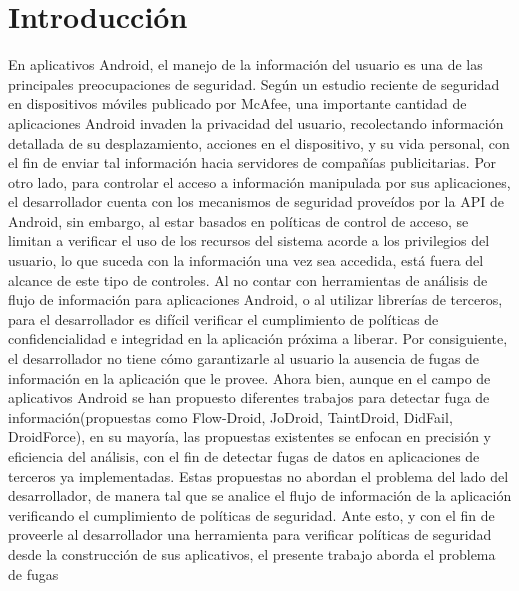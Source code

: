 \label{ch:introduccion}
\chapter{Introducción}
En aplicativos Android, el manejo de la información del usuario es una de las
principales preocupaciones de seguridad. Según un estudio reciente de seguridad
en dispositivos móviles publicado por McAfee\cite{McAfeeReport}, una importante
cantidad de aplicaciones Android invaden la privacidad del usuario, recolectando
información detallada de su desplazamiento, acciones en el dispositivo, y su
vida personal, con el fin de enviar tal información hacia servidores de
compañías publicitarias.\newline 
Por otro lado, para controlar el acceso a información manipulada por sus
aplicaciones, el desarrollador cuenta con los mecanismos de seguridad proveídos
por la API de Android, sin embargo, al estar basados en políticas de control de
acceso, se limitan a verificar el uso de los recursos del sistema acorde a los
privilegios del usuario, lo que suceda con la información una vez sea accedida,
está fuera del alcance de este tipo de controles.\newline 
Al no contar con herramientas de análisis de flujo de información para
aplicaciones Android, o al utilizar librerías de terceros, para el desarrollador
es difícil verificar el cumplimiento de políticas de confidencialidad e
integridad en la aplicación próxima a liberar. Por consiguiente, el
desarrollador no tiene cómo garantizarle al usuario la ausencia de fugas de
información en la aplicación que le provee.\newline 
Ahora bien, aunque en el campo de aplicativos Android se han propuesto
diferentes trabajos para detectar fuga de información(propuestas como
Flow-Droid\cite{FlowDroid-Thesis}, JoDroid\cite{JoDroid-Paper},
TaintDroid\cite{TaintDroid}, DidFail\cite{DidFail},
DroidForce\cite{DroidForce}), en su mayoría, las propuestas existentes se
enfocan en precisión y eficiencia del análisis, con el fin de detectar
fugas de datos en aplicaciones de terceros ya implementadas.
Estas propuestas no abordan el problema del lado del desarrollador, de
manera tal que se analice el flujo de información de la aplicación verificando
el cumplimiento de políticas de seguridad.\newline 
Ante esto, y con el fin de proveerle al desarrollador una
herramienta para verificar políticas de seguridad desde la
construcción de sus aplicativos, el presente trabajo aborda el problema de fugas
